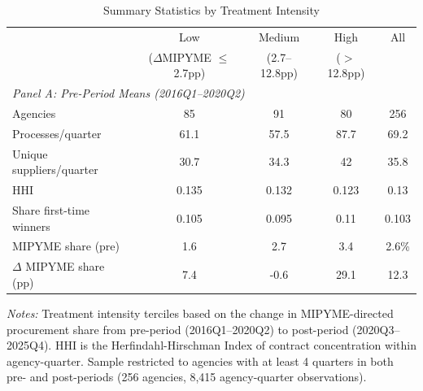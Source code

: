 \begin{table}[t]
\centering
\caption{Summary Statistics by Treatment Intensity}
\label{tab:summary}
\begin{tabular}{lcccc}
\hline\hline
 & Low & Medium & High & All \\
 & ($\Delta$MIPYME $\leq$ 2.7pp) & (2.7--12.8pp) & ($>$ 12.8pp) & \\
\hline
\multicolumn{5}{l}{\textit{Panel A: Pre-Period Means (2016Q1--2020Q2)}} \\
Agencies & 85 & 91 & 80 & 256 \\
Processes/quarter & 61.1 & 57.5 & 87.7 & 69.2 \\
Unique suppliers/quarter & 30.7 & 34.3 & 42 & 35.8 \\
HHI & 0.135 & 0.132 & 0.123 & 0.13 \\
Share first-time winners & 0.105 & 0.095 & 0.11 & 0.103 \\
MIPYME share (pre) & 1.6 & 2.7 & 3.4 & 2.6\% \\
$\Delta$ MIPYME share (pp) & 7.4 & -0.6 & 29.1 & 12.3 \\
\hline\hline
\end{tabular}
\begin{tablenotes}
\item \textit{Notes:} Treatment intensity terciles based on the change in MIPYME-directed procurement share from pre-period (2016Q1--2020Q2) to post-period (2020Q3--2025Q4). HHI is the Herfindahl-Hirschman Index of contract concentration within agency-quarter. Sample restricted to agencies with at least 4 quarters in both pre- and post-periods (256 agencies, 8,415 agency-quarter observations).
\end{tablenotes}
\end{table}

